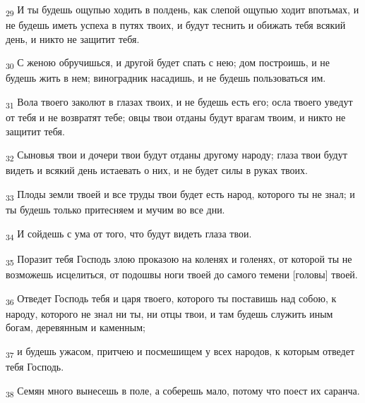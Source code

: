 \begin{tcolorbox}
\textsubscript{29} И ты будешь ощупью ходить в полдень, как слепой ощупью ходит впотьмах, и не будешь иметь успеха в путях твоих, и будут теснить и обижать тебя всякий день, и никто не защитит тебя.
\end{tcolorbox}
\begin{tcolorbox}
\textsubscript{30} С женою обручишься, и другой будет спать с нею; дом построишь, и не будешь жить в нем; виноградник насадишь, и не будешь пользоваться им.
\end{tcolorbox}
\begin{tcolorbox}
\textsubscript{31} Вола твоего заколют в глазах твоих, и не будешь есть его; осла твоего уведут от тебя и не возвратят тебе; овцы твои отданы будут врагам твоим, и никто не защитит тебя.
\end{tcolorbox}
\begin{tcolorbox}
\textsubscript{32} Сыновья твои и дочери твои будут отданы другому народу; глаза твои будут видеть и всякий день истаевать о них, и не будет силы в руках твоих.
\end{tcolorbox}
\begin{tcolorbox}
\textsubscript{33} Плоды земли твоей и все труды твои будет есть народ, которого ты не знал; и ты будешь только притесняем и мучим во все дни.
\end{tcolorbox}
\begin{tcolorbox}
\textsubscript{34} И сойдешь с ума от того, что будут видеть глаза твои.
\end{tcolorbox}
\begin{tcolorbox}
\textsubscript{35} Поразит тебя Господь злою проказою на коленях и голенях, от которой ты не возможешь исцелиться, от подошвы ноги твоей до самого темени [головы] твоей.
\end{tcolorbox}
\begin{tcolorbox}
\textsubscript{36} Отведет Господь тебя и царя твоего, которого ты поставишь над собою, к народу, которого не знал ни ты, ни отцы твои, и там будешь служить иным богам, деревянным и каменным;
\end{tcolorbox}
\begin{tcolorbox}
\textsubscript{37} и будешь ужасом, притчею и посмешищем у всех народов, к которым отведет тебя Господь.
\end{tcolorbox}
\begin{tcolorbox}
\textsubscript{38} Семян много вынесешь в поле, а соберешь мало, потому что поест их саранча.
\end{tcolorbox}
